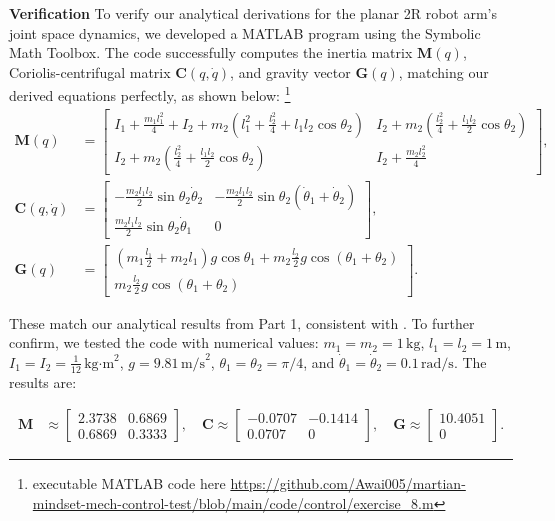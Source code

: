 \documentclass[12pt,a4paper]{article}
\begin{document}
\textbf{Verification}
To verify our analytical derivations for the planar 2R robot arm's joint space dynamics, we developed a MATLAB program using the Symbolic Math Toolbox. The code successfully computes the inertia matrix \( \bm{M}(q) \), Coriolis-centrifugal matrix \( \bm{C}(q, \dot{q}) \), and gravity vector \( \bm{G}(q) \), matching our derived equations perfectly, as shown below:
\footnote{executable MATLAB code here
\url{https://github.com/Awai005/martian-mindset-mech-control-test/blob/main/code/control/exercise_8.m}}
\begin{align*}
\bm{M}(q) &= \begin{bmatrix}
I_1 + \frac{m_1 l_1^2}{4} + I_2 + m_2 \left( l_1^2 + \frac{l_2^2}{4} + l_1 l_2 \cos \theta_2 \right) & I_2 + m_2 \left( \frac{l_2^2}{4} + \frac{l_1 l_2}{2} \cos \theta_2 \right) \\
I_2 + m_2 \left( \frac{l_2^2}{4} + \frac{l_1 l_2}{2} \cos \theta_2 \right) & I_2 + \frac{m_2 l_2^2}{4}
\end{bmatrix}, \\
\bm{C}(q, \dot{q}) &= \begin{bmatrix}
-\frac{m_2 l_1 l_2}{2} \sin \theta_2 \dot{\theta}_2 & -\frac{m_2 l_1 l_2}{2} \sin \theta_2 (\dot{\theta}_1 + \dot{\theta}_2) \\
\frac{m_2 l_1 l_2}{2} \sin \theta_2 \dot{\theta}_1 & 0
\end{bmatrix}, \\
\bm{G}(q) &= \begin{bmatrix}
\left( m_1 \frac{l_1}{2} + m_2 l_1 \right) g \cos \theta_1 + m_2 \frac{l_2}{2} g \cos (\theta_1 + \theta_2) \\
m_2 \frac{l_2}{2} g \cos (\theta_1 + \theta_2)
\end{bmatrix}.
\end{align*}

These match our analytical results from Part 1, consistent with \cite[Eqs.~7-44, 7-45]{Asada2022}. To further confirm, we tested the code with numerical values: \( m_1 = m_2 = 1 \, \text{kg} \), \( l_1 = l_2 = 1 \, \text{m} \), \( I_1 = I_2 = \frac{1}{12} \, \text{kg·m}^2 \), \( g = 9.81 \, \text{m/s}^2 \), \( \theta_1 = \theta_2 = \pi/4 \), and \( \dot{\theta}_1 = \dot{\theta}_2 = 0.1 \, \text{rad/s} \). The results are:

\begin{align*}
\bm{M} &\approx \begin{bmatrix} 2.3738 & 0.6869 \\ 0.6869 & 0.3333 \end{bmatrix}, \quad
\bm{C} \approx \begin{bmatrix} -0.0707 & -0.1414 \\ 0.0707 & 0 \end{bmatrix}, \quad
\bm{G} \approx \begin{bmatrix} 10.4051 \\ 0 \end{bmatrix}.
\end{align*}
\end{document}
